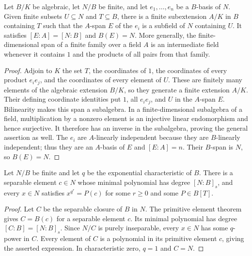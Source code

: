 \begin{lemma}\label{lem:finite-basis-descent}
\leanok
{}
Let $B/K$ be algebraic, let $N/B$ be finite, and let
$e_1,\ldots,e_n$ be a $B$-basis of $N$. Given finite subsets
$U\subseteq N$ and $T\subseteq B$, there is a finite subextension
$A/K$ in $B$ containing $T$ such that the $A$-span $E$ of the $e_i$
is a subfield of $N$ containing $U$. It satisfies
$[E:A]=[N:B]$ and $B(E)=N$.
More generally, the finite-dimensional span of a finite family over a
field $A$ is an intermediate field whenever it contains $1$ and the
products of all pairs from that family.
\end{lemma}
\begin{proof}
Adjoin to $K$ the set $T$, the coordinates of $1$, the coordinates of
every product $e_i e_j$, and the coordinates of every element of $U$.
These are finitely many elements of the algebraic extension $B/K$, so
they generate a finite extension $A/K$. Their defining coordinate
identities put $1$, all $e_i e_j$, and $U$ in the $A$-span $E$.
Bilinearity makes this span a subalgebra. In a finite-dimensional
subalgebra of a field, multiplication by a nonzero element is an
injective linear endomorphism and hence surjective. It therefore has
an inverse in the subalgebra, proving the general assertion as well.
The $e_i$ are $A$-linearly independent because they are
$B$-linearly independent; thus they are an $A$-basis of $E$ and
$[E:A]=n$. Their $B$-span is $N$, so $B(E)=N$.
\end{proof}

\begin{lemma}
\label{lem:separable-generator-powers}
\leanok
{}
Let $N/B$ be finite and let $q$ be the exponential characteristic of
$B$. There is a separable element $c\in N$ whose minimal polynomial
has degree $[N:B]_s$, and every $x\in N$ satisfies
$x^{q^r}=P(c)$ for some $r\geq0$ and some $P\in B[T]$.
\end{lemma}
\begin{proof}
Let $C$ be the separable closure of $B$ in $N$. The primitive element
theorem gives $C=B(c)$ for a separable element $c$. Its minimal
polynomial has degree $[C:B]=[N:B]_s$. Since $N/C$ is purely
inseparable, every $x\in N$ has some $q$-power in $C$. Every element
of $C$ is a polynomial in its primitive element $c$, giving the
asserted expression. In characteristic zero, $q=1$ and $C=N$.
\end{proof}

